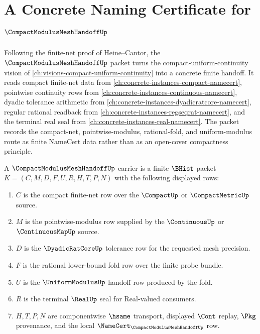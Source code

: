 \chapter{A Concrete Naming Certificate for $\CompactModulusMeshHandoffUp$}
\label{ch:concrete-instances-compact-modulus-mesh-handoff-namecert}

Following the finite-net proof of Heine--Cantor, the $\CompactModulusMeshHandoffUp$ packet turns the compact-uniform-continuity vision of \autoref{ch:visions-compact-uniform-continuity} into a concrete finite handoff. It reads compact finite-net data from \autoref{ch:concrete-instances-compact-namecert}, pointwise continuity rows from \autoref{ch:concrete-instances-continuous-namecert}, dyadic tolerance arithmetic from \autoref{ch:concrete-instances-dyadicratcore-namecert}, regular rational readback from \autoref{ch:concrete-instances-regseqrat-namecert}, and the terminal real seal from \autoref{ch:concrete-instances-real-namecert}. The packet records the compact-net, pointwise-modulus, rational-fold, and uniform-modulus route as finite NameCert data rather than as an open-cover compactness principle.

\begin{definition}
\label{def:compact-modulus-mesh-handoff-carrier}
A $\CompactModulusMeshHandoffUp$ carrier is a finite $\BHist$ packet $K=(C,M,D,F,U,R,H,T,P,N)$ with the following displayed rows:
\begin{enumerate}
\item $C$ is the compact finite-net row over the $\CompactUp$ or $\CompactMetricUp$ source.
\item $M$ is the pointwise-modulus row supplied by the $\ContinuousUp$ or $\ContinuousMapUp$ source.
\item $D$ is the $\DyadicRatCoreUp$ tolerance row for the requested mesh precision.
\item $F$ is the rational lower-bound fold row over the finite probe bundle.
\item $U$ is the $\UniformModulusUp$ handoff row produced by the fold.
\item $R$ is the terminal $\RealUp$ seal for Real-valued consumers.
\item $H,T,P,N$ are componentwise $\hsame$ transport, displayed $\Cont$ replay, $\Pkg$ provenance, and the local $\NameCert_{\CompactModulusMeshHandoffUp}$ row.
\end{enumerate}
\end{definition}

